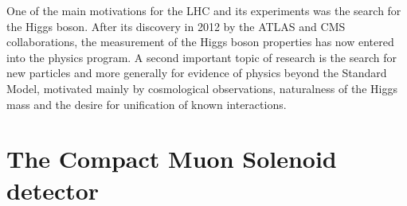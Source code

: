 One of the main motivations for the LHC and its experiments was the search for the Higgs boson. After its discovery in 2012 by the ATLAS and CMS collaborations, the measurement of the Higgs boson properties has now entered into the physics program. A second important topic of research is the search for new particles and more generally for evidence of physics beyond the Standard Model, motivated mainly by cosmological observations, naturalness of the Higgs mass and the desire for unification of known interactions.



\section{The Compact Muon Solenoid detector~\label{sec:CMS}}


